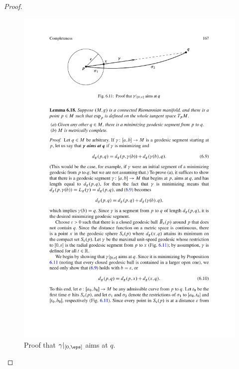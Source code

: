 \begin{proof}
\begin{figure}[htbp]
\includegraphics{pictures/Hopf-Rinow-lem-1}
\caption{Proof that $\gamma|_{[0,\eps]}$ aims at $q$.}
\end{figure}


\end{proof}
